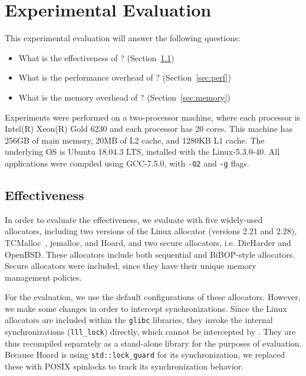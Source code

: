 \section{Experimental Evaluation}
\label{sec:evaluation}

This experimental evaluation will answer the following questions:
\begin{itemize}
\item What is the effectiveness of \MP{}? (Section~\ref{sec:effectiveness}) 	
\item What is the performance overhead of \MP{}? (Section~\ref{sec:perf})
\item What is the memory overhead of \MP{}? (Section~\ref{sec:memory})
\end{itemize}

Experiments were performed on a two-processor machine, where each processor is Intel(R) Xeon(R) Gold 6230 and each processor has 20 cores. This machine has 256GB of main memory, 20MB of L2 cache, and 1280KB L1 cache. The underlying OS is Ubuntu 18.04.3 LTS, installed with the Linux-5.3.0-40. All applications were compiled using GCC-7.5.0, with \texttt{-O2} and \texttt{-g} flags.

\subsection{Effectiveness}
\label{sec:effectiveness}

In order to evaluate the effectiveness, we evaluate \MP{} with five widely-used allocators, including two versions of the Linux allocator (versions 2.21 and 2.28), TCMalloc~\citep{tcmalloc}, jemalloc, and Hoard, and two secure allocators, i.e. DieHarder and OpenBSD. These allocators include both sequential and BiBOP-style allocators. Secure allocators were included, since they have their unique memory management policies. 

For the evaluation, we use the default configurations of these allocators. However, we make some changes in order to  intercept synchronizations. Since the Linux allocators are included within the \texttt{glibc} libraries, they invoke the internal synchronizations (\texttt{lll\_lock}) directly, which cannot be intercepted by \MP{}. They are thus recompiled separately as a stand-alone library for the purposes of evaluation. Because Hoard is using \texttt{std::lock\_guard} for its synchronization, we replaced these with POSIX spinlocks to track its synchronization behavior.


